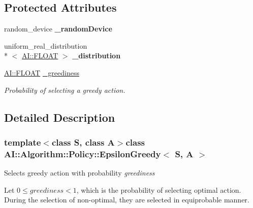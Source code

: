 \subsection*{Protected Attributes}
\begin{DoxyCompactItemize}
\item 
\hypertarget{classAI_1_1Algorithm_1_1Policy_1_1EpsilonGreedy_a54f479df739292986b34a7c79c1d9dee}{random\-\_\-device {\bfseries \-\_\-random\-Device}}\label{classAI_1_1Algorithm_1_1Policy_1_1EpsilonGreedy_a54f479df739292986b34a7c79c1d9dee}

\item 
\hypertarget{classAI_1_1Algorithm_1_1Policy_1_1EpsilonGreedy_af9535e90c13a9a47074721d72a765339}{uniform\-\_\-real\-\_\-distribution\\*
$<$ \hyperlink{namespaceAI_a41b74884a20833db653dded3918e05c3}{A\-I\-::\-F\-L\-O\-A\-T} $>$ {\bfseries \-\_\-distribution}}\label{classAI_1_1Algorithm_1_1Policy_1_1EpsilonGreedy_af9535e90c13a9a47074721d72a765339}

\item 
\hypertarget{classAI_1_1Algorithm_1_1Policy_1_1EpsilonGreedy_a2726a82fb23e6960c24402a756fef356}{\hyperlink{namespaceAI_a41b74884a20833db653dded3918e05c3}{A\-I\-::\-F\-L\-O\-A\-T} \hyperlink{classAI_1_1Algorithm_1_1Policy_1_1EpsilonGreedy_a2726a82fb23e6960c24402a756fef356}{\-\_\-greediness}}\label{classAI_1_1Algorithm_1_1Policy_1_1EpsilonGreedy_a2726a82fb23e6960c24402a756fef356}

\begin{DoxyCompactList}\small\item\em Probability of selecting a greedy action. \end{DoxyCompactList}\end{DoxyCompactItemize}


\subsection{Detailed Description}
\subsubsection*{template$<$class S, class A$>$class A\-I\-::\-Algorithm\-::\-Policy\-::\-Epsilon\-Greedy$<$ S, A $>$}

Selects greedy action with probability {\itshape greediness} 

Let $ 0 \leq greediness < 1 $, which is the probability of selecting optimal action. During the selection of non-\/optimal, they are selected in equiprobable manner.


